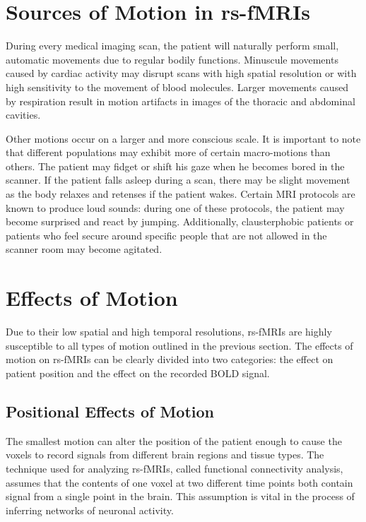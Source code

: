 \section{Sources of Motion in rs-fMRIs}

During every medical imaging scan, the patient will naturally perform small, automatic movements due to regular bodily functions. Minuscule movements caused by cardiac activity may disrupt scans with high spatial resolution or with high sensitivity to the movement of blood molecules. Larger movements caused by respiration result in motion artifacts in images of the thoracic and abdominal cavities. 

Other motions occur on a larger and more conscious scale. It is important to note that different populations may exhibit more of certain macro-motions than others. The patient may fidget or shift his gaze when he becomes bored in the scanner. If the patient falls asleep during a scan, there may be slight movement as the body relaxes and retenses if the patient wakes. Certain MRI protocols are known to produce loud sounds: during one of these protocols, the patient may become surprised and react by jumping. Additionally, clausterphobic patients or patients who feel secure around specific people that are not allowed in the scanner room may become agitated. 


\section{Effects of Motion}

Due to their low spatial and high temporal resolutions, rs-fMRIs are highly susceptible to all types of motion outlined in the previous section. The effects of motion on rs-fMRIs can be clearly divided into two categories: the effect on patient position and the effect on the recorded BOLD signal.

\subsection{Positional Effects of Motion}

The smallest motion can alter the position of the patient enough to cause the voxels to record signals from different brain regions and tissue types. The technique used for analyzing rs-fMRIs, called functional connectivity analysis, assumes that the contents of one voxel at two different time points both contain signal from a single point in the brain. This assumption is vital in the process of inferring networks of neuronal activity. 

